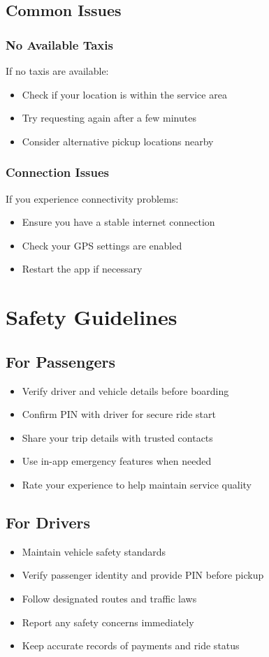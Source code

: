 \documentclass[12pt]{article}
\begin{document}
\subsection{Common Issues}
\subsubsection{No Available Taxis}
If no taxis are available:
\begin{itemize}
    \item Check if your location is within the service area
    \item Try requesting again after a few minutes
    \item Consider alternative pickup locations nearby
\end{itemize}

\subsubsection{Connection Issues}
If you experience connectivity problems:
\begin{itemize}
    \item Ensure you have a stable internet connection
    \item Check your GPS settings are enabled
    \item Restart the app if necessary
\end{itemize}

\section{Safety Guidelines}

\subsection{For Passengers}
\begin{itemize}
    \item Verify driver and vehicle details before boarding
    \item Confirm PIN with driver for secure ride start
    \item Share your trip details with trusted contacts
    \item Use in-app emergency features when needed
    \item Rate your experience to help maintain service quality
\end{itemize}

\subsection{For Drivers}
\begin{itemize}
    \item Maintain vehicle safety standards
    \item Verify passenger identity and provide PIN before pickup
    \item Follow designated routes and traffic laws
    \item Report any safety concerns immediately
    \item Keep accurate records of payments and ride status
\end{itemize}
\end{document}
